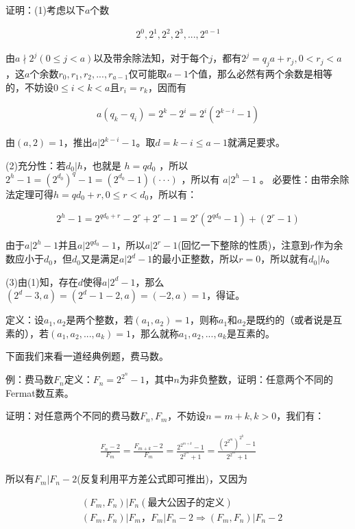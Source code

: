 \documentclass[12pt, a4paper, oneside]{ctexart}
\begin{document}
证明：(1)考虑以下$a$个数

$$\begin{align*}
2^0,2^1,2^2,2^3,...,2^{a-1}
\end{align*}$$

由$a\nmid 2^j(0\leqslant j<a)$以及带余除法知，对于每个$j$，都有$2^j=q_ja+r_j,0<r_j<a$，这$a$个余数$r_0,r_1,r_2,...,r_{a-1}$仅可能取$a-1$个值，那么必然有两个余数是相等的，不妨设$0\leqslant i<k<a$且$r_i=r_k$，因而有

$$\begin{align*}
a(q_k-q_i)=2^k-2^i=2^i(2^{k-i}-1)
\end{align*}$$

由$(a,2)=1$，推出$a|2^{k-i}-1$。取$d=k-i\leqslant a-1$就满足要求。

(2)充分性：若$d_0|h$，也就是 $h=qd_0$ ，所以 $2^h-1=(2^{d_0})^q-1=(2^{d_0}-1)(\cdot\cdot\cdot)$ ，所以有 $a|2^h-1$ 。  
必要性：由带余除法定理可得$h=qd_0+r,0\leqslant r<d_0$，所以有：


$$\begin{align*}
2^h-1=2^{qd_0+r}-2^r+2^r-1=2^r(2^{qd_0}-1)+(2^r-1)
\end{align*}$$

由于$a|2^h-1$并且$a|2^{qd_0}-1$，所以$a|2^r-1$(回忆一下整除的性质)，注意到$r$作为余数应小于$d_0$，但$d_0$又是满足$a|2^d-1$的最小正整数，所以$r=0$，所以就有$d_0|h$。 

(3)由(1)知，存在$d$使得$a|2^d-1$，那么$(2^d-3,a)=(2^d-1-2,a)=(-2,a)=1$，得证。

定义：设$a_1,a_2$是两个整数，若$(a_1,a_2)=1$，则称$a_1$和$a_2$是既约的（或者说是互素的），若$(a_1,a_2,...,a_k)=1$，那么就称$a_1,a_2,...,a_k$是互素的。

下面我们来看一道经典例题，费马数。

例：费马数$F_n$定义：$F_n=2^{2^n}-1$，其中$n$为非负整数，证明：任意两个不同的Fermat数互素。

证明：对任意两个不同的费马数$F_n,F_m$，不妨设$n=m+k,k>0$，我们有：

$$\begin{align*}
\frac{F_n-2}{F_m}=\frac{F_{m+k}-2}{F_m}=\frac{2^{2^{m+k}}-1}{2^{2^m}+1}=\frac{(2^{2^m})^{2^k}-1}{2^{2^m}+1}
\end{align*}$$

所以有$F_m|F_n-2$(反复利用平方差公式即可推出)，又因为 

$$\begin{align*}
&(F_m,F_n)|F_n(最大公因子的定义)\\
&(F_m,F_n)|F_m，F_m|F_n-2\Rightarrow (F_m,F_n)|F_n-2
\end{align*}$$
\end{document}
